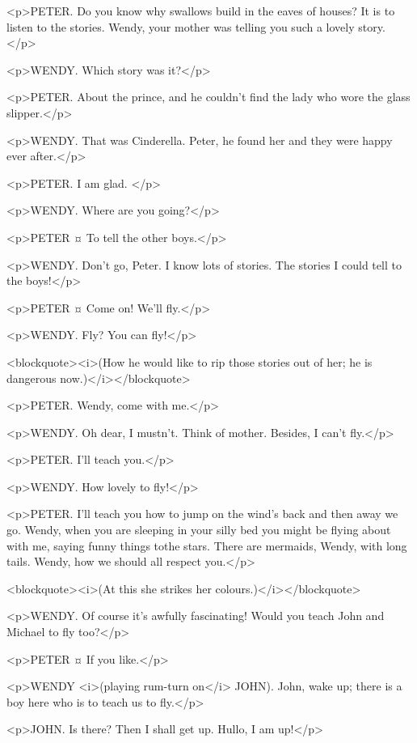 <p>PETER. Do you know why swallows build in the eaves of houses? It is to listen to the stories. Wendy, your mother was telling you such a lovely story.</p>

<p>WENDY. Which story was it?</p>

<p>PETER. About the prince, and he couldn't find the lady who wore the glass slipper.</p>

<p>WENDY. That was Cinderella. Peter, he found her and they were happy ever after.</p>

<p>PETER. I am glad.
</p>

<p>WENDY. Where are you going?</p>

<p>PETER ¤
To tell the other boys.</p>

<p>WENDY. Don't go, Peter. I know lots of stories. The stories I could tell to the boys!</p>

<p>PETER ¤
Come on! We'll fly.</p>

<p>WENDY. Fly? You can fly!</p>

<blockquote><i>(How he would like to rip those stories out of her; he is dangerous now.)</i></blockquote>

<p>PETER. Wendy, come with me.</p>

<p>WENDY. Oh dear, I mustn't. Think of mother. Besides, I can't fly.</p>

<p>PETER. I'll teach you.</p>

<p>WENDY. How lovely to fly!</p>

<p>PETER. I'll teach you how to jump on the wind's back and then away we go. Wendy, when you are sleeping in your silly bed you might be flying about with me, saying funny things tothe stars. There are mermaids, Wendy, with long tails.
Wendy, how we should all respect you.</p>

<blockquote><i>(At this she strikes her colours.)</i></blockquote>

<p>WENDY. Of course it's awfully fascinating! Would you teach John and Michael to fly too?</p>

<p>PETER ¤
If you like.</p>

<p>WENDY <i>(playing rum-turn on</i> JOHN). John, wake up; there is a boy here who is to teach us to fly.</p>

<p>JOHN. Is there? Then I shall get up.
Hullo, I am up!</p>

